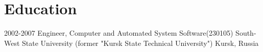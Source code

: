 \section{\faGraduationCap{} Education}

\cventry
{2002-2007}
{Engineer, Computer and Automated System Software(230105)}
{South-West State University (former "Kursk State Technical University")}
{Kursk, Russia}
{}
{}
